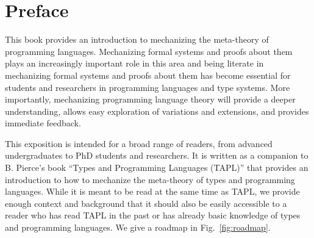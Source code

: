 \chapter*{Preface}
This book provides an introduction to mechanizing the meta-theory of programming languages. Mechanizing formal systems and proofs about them plays an increasingly important role in this area and being literate in mechanizing formal systems and proofs about them  has become essential for students and researchers in programming languages and type systems. More importantly, mechanizing programming language theory will provide a deeper understanding, allows easy  exploration of variations and extensions, and provides immediate feedback.

This exposition is intended for a broad range of readers, from
advanced undergraduates to PhD students and researchers.  It is
written as a companion to B. Pierce's book ``Types and Programming
Languages (TAPL)'' that provides an introduction to how to mechanize
the meta-theory of types and programming languages. While it is meant
to be read  at the same time as TAPL, we provide enough context and
background that it should also be easily accessible to a reader who
has read TAPL in the past or has already basic knowledge of types and
programming languages. We give a roadmap in Fig.~\ref{fig:roadmap}.


